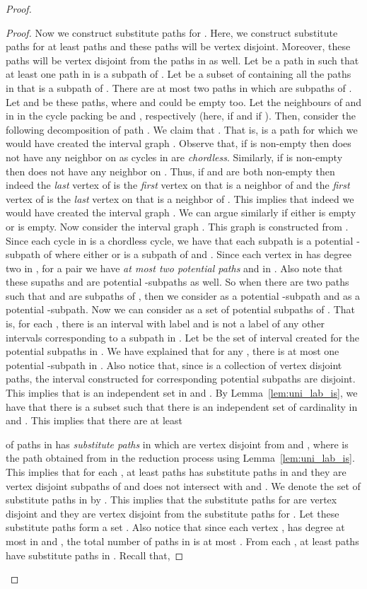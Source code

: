 \begin{proof}
\begin{proof}
Now we construct substitute paths for . Here, we construct substitute paths for at least  
paths and these paths will be vertex disjoint. Moreover, these paths will be vertex disjoint from the paths in  as well. 
Let  be a path in  such that at least one path in  is a subpath of . 
Let  be a subset of  containing all the paths in  that is a subpath of . 
There are at most two paths in  which 
are subpaths of . Let  and  be these paths, where  and  could be empty too. 
 Let the neighbours of  and  in  in the cycle packing  be  and , respectively 
(here,  if  and  if ).  
Then, consider the  following decomposition of path . We claim that . That is,  is a path for which we would have created the interval graph .  
Observe that, if  is non-empty then   does not have any neighbor on  as cycles in  are {\em chordless}. Similarly, if  is non-empty then  does not have any neighbor on . 
Thus, if  and  are both non-empty then indeed the {\em last} vertex of  is the {\em first}  vertex on  that is a neighbor of  and the {\em first} vertex of  is the {\em last} vertex on  that is a neighbor of . This implies that indeed we would have created the interval graph . We can argue similarly if either  is empty or  is empty.  
Now consider the interval graph . This graph is constructed from . 
Since 
each cycle in  is a chordless cycle, we have that 
each subpath  is a potential -subpath of  where 
either  or  is a subpath of  and .
Since each vertex in  has degree two in , 
for a pair  we have {\em at most two potential  paths} 
 and  in . Also note that these supaths  and  are 
potential -subpaths as well. So when there are two paths  
such that  and  are subpaths of , then we consider  
as a potential -subpath and  as  a potential -subpath.  
Now we can consider  as a set of potential subpaths of . 
That is, for each 
, there is an interval  with label  
and  is not a label of any other intervals corresponding to a subpath in 
.
Let  be the set of interval created for the potential subpaths in . 
We have explained that for 
any , there is at most one potential -subpath in . 
Also notice that, since  is a collection of vertex disjoint paths, the interval 
constructed for corresponding potential subpaths are disjoint. This 
implies that  is an independent set in   and 
. 
By Lemma~\ref{lem:uni_lab_is}, we have that 
there is a subset 
such that there is an independent set  of cardinality 
in  and . This implies that there are at least 
 
of paths in  has {\em substitute paths} in  which are vertex disjoint from 
 and , where  is the path obtained from  in the reduction process using Lemma~\ref{lem:uni_lab_is}. This implies that for 
each , at least  paths has 
substitute paths in  and they are vertex disjoint subpaths of  and does not intersect 
with  and . We denote the set of substitute paths in  by . 
This implies that the substitute paths for  are vertex disjoint and they are vertex disjoint from the 
substitute paths for . Let these substitute paths form a set . 
Also notice that 
since each vertex , has degree at most  in  and , 
the total number of paths in  is at most .
From each , at least  paths have 
substitute paths in . Recall that, 


\end{proof}
\end{proof}
